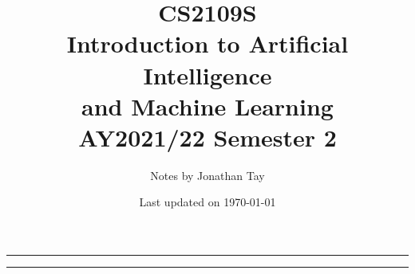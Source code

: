 \documentclass{article}
\title{\vspace{-1cm}\textbf{CS2109S \\[0.25em] Introduction to Artificial Intelligence \\ and Machine Learning} \\[2em] \Large AY2021/22 Semester 2 \\[1em]}
\author{Notes by Jonathan Tay}
\date{Last updated on \today}
\newcommand{\pageline}[1]{\par\noindent\rule{\textwidth}{#1}}
\begin{document}
    \maketitle
    \pageline{1.5pt}
    \renewcommand{\baselinestretch}{0.75}\normalsize
    \tableofcontents
    \renewcommand{\baselinestretch}{1.15}\normalsize
    \pageline{1.5pt}

    \newpage
    \begin{multicols*}{2}
        
        
        
        
        
        
        
        
    \end{multicols*}
\end{document}
